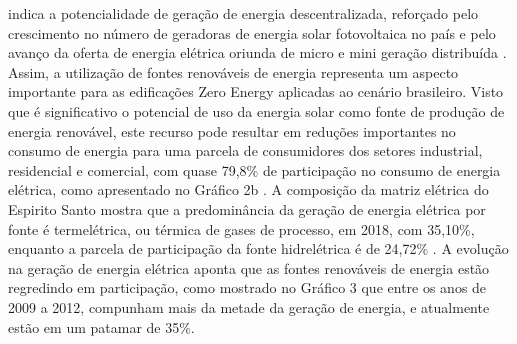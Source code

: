 \begin{onehalfspace}
    indica a potencialidade de geração de energia descentralizada, reforçado pelo crescimento 
    no número de geradoras de energia solar fotovoltaica no país e pelo avanço da oferta de energia 
    elétrica oriunda de micro e mini geração distribuída \cite{EmpresadePesquisaEnergetica-EPE2019,EmpresadePesquisaEnergetica-EPE2019a,Pereira2017}.\vspace{0.3cm} \newline
    Assim, a utilização de fontes renováveis de energia representa um aspecto importante para as 
    edificações Zero Energy aplicadas ao cenário brasileiro. Visto que é significativo o potencial 
    de uso da energia solar como fonte de produção de energia renovável, este recurso pode resultar 
    em reduções importantes no consumo de energia para uma parcela de consumidores dos setores 
    industrial, residencial e comercial, com quase 79,8\% de participação no consumo de energia 
    elétrica, como apresentado no Gráfico 2b \cite{Cronemberger2012,EmpresadePesquisaEnergetica-EPE2019,Sorgato2018,Sudhakar2019}.\vspace{0.3cm} \newline
    A composição da matriz elétrica do Espirito Santo mostra que a predominância da geração de 
    energia elétrica por fonte é termelétrica, ou térmica de gases de processo, em 2018, com 35,10\%, 
    enquanto a parcela de participação da fonte hidrelétrica é de 24,72\% \cite{AgenciadeRegulacaodeServicosPublicosdoEspiritoSanto-ARSP2018}.\vspace{0.3cm} \newline
    A evolução na geração de energia elétrica aponta que as fontes renováveis de energia estão 
    regredindo em participação, como mostrado no Gráfico 3 que entre os anos de 
    2009 a 2012, compunham mais da metade da geração de energia, e atualmente estão em um 
    patamar de 35\%.%


\end{onehalfspace}
